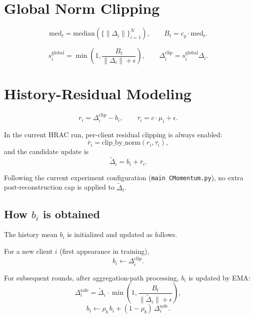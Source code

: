 \documentclass[12pt]{report}
\begin{document}
\section{Global Norm Clipping}

\begin{equation}
\mathrm{med}_t = \mathrm{median}\left(\{\|\Delta_i\|\}_{i=1}^{N}\right), \qquad
B_t = c_g \cdot \mathrm{med}_t.
\end{equation}

\begin{equation}
s_i^{\mathrm{global}}=\min\left(1,\frac{B_t}{\|\Delta_i\|+\epsilon}\right), \qquad
\Delta_i^{\mathrm{clip}}=s_i^{\mathrm{global}}\Delta_i.
\end{equation}

\section{History-Residual Modeling}

\begin{equation}
r_i=\Delta_i^{\mathrm{clip}}-b_i, \qquad \tau_i=c\cdot\mu_i+\epsilon.
\end{equation}

In the current HRAC run, per-client residual clipping is always enabled:
\begin{equation}
\bar{r}_i=\mathrm{clip\_by\_norm}(r_i,\tau_i),
\end{equation}
and the candidate update is
\begin{equation}
\tilde{\Delta}_i=b_i+\bar{r}_i.
\end{equation}

Following the current experiment configuration (\texttt{main CMomentum.py}), no extra post-reconstruction cap is applied to $\tilde{\Delta}_i$.

\subsection*{How $b_i$ is obtained}

The history mean $b_i$ is initialized and updated as follows.

For a new client $i$ (first appearance in training),
\begin{equation}
b_i \leftarrow \Delta_i^{\mathrm{clip}}.
\end{equation}

For subsequent rounds, after aggregation-path processing, $b_i$ is updated by EMA:
\begin{equation}
\Delta_i^{\mathrm{safe}}=\tilde{\Delta}_i\cdot
\min\left(1,\frac{B_t}{\|\tilde{\Delta}_i\|+\epsilon}\right),
\end{equation}
\begin{equation}
b_i \leftarrow \rho_b\, b_i + (1-\rho_b)\,\Delta_i^{\mathrm{safe}}.
\end{equation}
\end{document}
